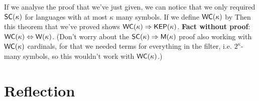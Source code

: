 \documentclass{article}
\begin{document}
If we analyse the proof that we've just given, we can notice that we only required $\mathsf{SC}(\kappa)$ for languages with at most $\kappa$ many symbols. If we define $\mathsf{WC}(\kappa)$ by  Then this theorem that we've proved shows $\mathsf{WC}(\kappa) \Rightarrow \mathsf{KEP}(\kappa)$. \gap 
\textbf{Fact without proof}: $\mathsf{WC}(\kappa) \Leftrightarrow \mathsf{W}(\kappa)$.\gap 
(Don't worry about the $\mathsf{SC}(\kappa) \Rightarrow \mathsf{M}(\kappa)$ proof also working with $\mathsf{WC}(\kappa)$ cardinals, for that we needed terms for everything in the filter, i.e. $2^{\kappa}$-many symbols, so this wouldn't work with $\mathsf{WC}(\kappa)$.)
\newlec 
\section{Reflection}
\end{document}
